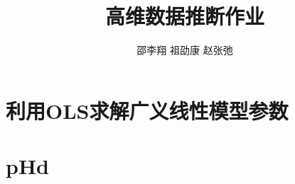 \documentclass[cn,11pt]{elegantpaper}
\title{高维数据推断作业}
\author{邵李翔 \quad 祖劭康 \quad 赵张弛}
\date{}
\begin{document}
    


\maketitle
\newpage
\tableofcontents

\newpage
\section{利用OLS求解广义线性模型参数}



\section{pHd}

% 

% 
\end{document}
